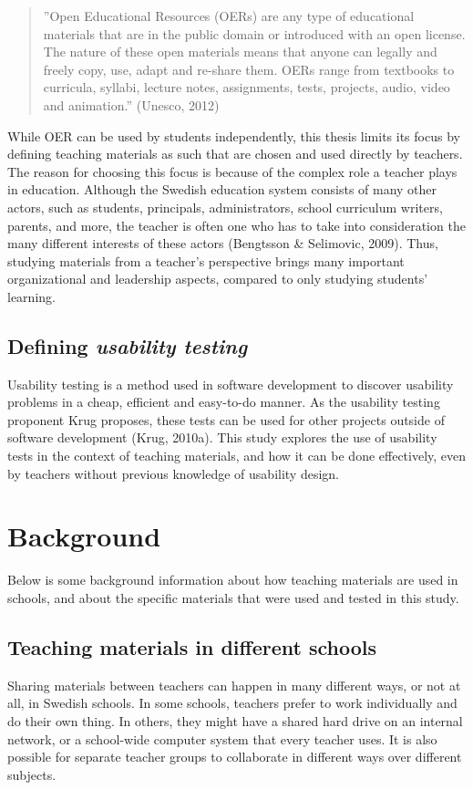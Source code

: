 \begin{quote}
''Open Educational Resources (OERs) are any type of educational materials that are in
the public domain or introduced with an open license. The nature of these open
materials means that anyone can legally and freely copy, use, adapt and re-share them.
OERs range from textbooks to curricula, syllabi, lecture notes, assignments, tests,
projects, audio, video and animation.'' (Unesco, 2012)
\end{quote}

While OER can be used by students independently, this thesis limits its focus by defining teaching materials as such that are chosen and used directly by teachers. The reason for choosing this focus is because of the complex role a teacher plays in education. Although the Swedish education system consists of many other actors, such as students, principals, administrators, school curriculum writers, parents, and more, the teacher is often one who has to take into consideration the many different interests of these actors (Bengtsson \& Selimovic, 2009). Thus, studying materials from a teacher's perspective brings many important organizational and leadership aspects, compared to only studying students' learning.

\subsection{Defining \textit{usability testing}}
Usability testing is a method used in software development to discover usability problems in a cheap, efficient and easy-to-do manner. As the usability testing proponent Krug proposes, these tests can be used for other projects outside of software development (Krug, 2010a). This study explores the use of usability tests in the context of teaching materials, and how it can be done effectively, even by teachers without previous knowledge of usability design.

\section{Background}
Below is some background information about how teaching materials are used in schools, and about the specific materials that were used and tested in this study.

\subsection{Teaching materials in different schools}
Sharing materials between teachers can happen in many different ways, or not at all, in Swedish schools. In some schools, teachers prefer to work individually and do their own thing. In others, they might have a shared hard drive on an internal network, or a school-wide computer system that every teacher uses. It is also possible for separate teacher groups to collaborate in different ways over different subjects.

